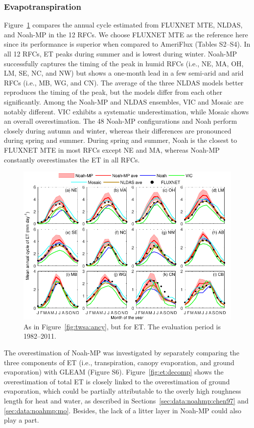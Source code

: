 \documentclass[essd, manuscript]{copernicus}
\begin{document}
\subsubsection{Evapotranspiration}\label{sec:results:et}

Figure~\ref{fig:et:ancy} compares the annual cycle estimated from FLUXNET MTE, NLDAS, and Noah-MP in the 12 RFCs. We choose FLUXNET MTE as the reference here since its performance is superior when compared to AmeriFlux (Tables S2--S4). In all 12 RFCs, ET peaks during summer and is lowest during winter. Noah-MP successfully captures the timing of the peak in humid RFCs (i.e., NE, MA, OH, LM, SE, NC, and NW) but shows a one-month lead in a few semi-arid and arid RFCs (i.e., MB, WG, and CN). The average of the three NLDAS models better reproduces the timing of the peak, but the models differ from each other significantly. Among the Noah-MP and NLDAS ensembles, VIC and Mosaic are notably different. VIC exhibits a systematic underestimation, while Mosaic shows an overall overestimation. The 48 Noah-MP configurations and Noah perform closely during autumn and winter, whereas their differences are pronounced during spring and summer. During spring and summer, Noah is the closest to FLUXNET MTE in most RFCs except NE and MA, whereas Noah-MP constantly overestimates the ET in all RFCs.

\begin{figure}[t]
  \includegraphics[width=12cm]{fig/fig10.pdf}
  \caption{As in Figure~\ref{fig:twsa:ancy}, but for ET. The evaluation period is 1982--2011.}
  \label{fig:et:ancy}
\end{figure}

The overestimation of Noah-MP was investigated by separately comparing the three components of ET (i.e., transpiration, canopy evaporation, and ground evaporation) with GLEAM (Figure S6). Figure~\ref{fig:et:decomp} shows the overestimation of total ET is closely linked to the overestimation of ground evaporation, which could be partially attributable to the overly high roughness length for heat and water, as described in Sections~\ref{sec:data:noahmp:chen97} and \ref{sec:data:noahmp:mo}. Besides, the lack of a litter layer \citep{decker2017JAMES} in Noah-MP could also play a part.
\end{document}
